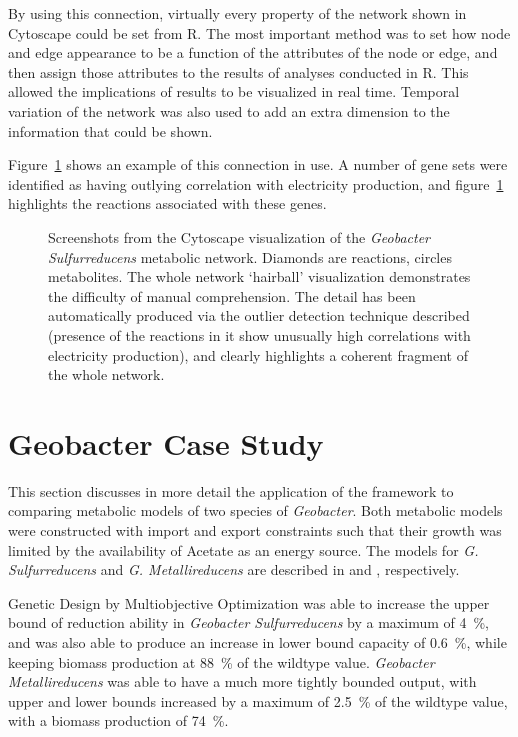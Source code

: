 \documentclass[a4paper]{article}
\begin{document}
By using this connection, virtually every property of the network shown in Cytoscape could be set from R. The most important method was to set how node and edge appearance to be a function of the attributes of the node or edge, and then assign those attributes to the results of analyses conducted in R. This allowed the implications of results to be visualized in real time. Temporal variation of the network was also used to add an extra dimension to the information that could be shown.

Figure~\ref{fig:cytoscape-screenshot} shows an example of this connection in use. A number of gene sets were identified as having outlying correlation with electricity production, and figure~\ref{fig:cytoscape-screenshot} highlights the reactions associated with these genes. 

\begin{figure}[!htb]
\caption{Screenshots from the Cytoscape visualization of the {\it Geobacter Sulfurreducens} metabolic network. 
Diamonds are reactions, circles metabolites. 
The whole network `hairball' visualization demonstrates the difficulty of manual comprehension. 
The detail has been automatically produced via the outlier detection technique described (presence of the reactions in it show unusually high correlations with electricity production), and clearly highlights a coherent fragment of the whole network.}
\label{fig:cytoscape-screenshot}
\end{figure}

\section{Geobacter Case Study}
This section discusses in more detail the application of the framework to comparing metabolic models of two species of {\it Geobacter}. Both metabolic models were constructed with import and export constraints such that their growth was limited by the availability of Acetate as an energy source. The models for {\it G. Sulfurreducens} and {\it G. Metallireducens} are described in \cite{Mahadevan2006} and \cite{Sun2009}, respectively.

Genetic Design by Multiobjective Optimization was able to increase the upper bound of  reduction ability in {\it Geobacter Sulfurreducens} by a maximum of \SI{4}{\percent}, and was also able to produce an increase in lower bound capacity of  \SI{0.6}{\percent}, while keeping biomass production at  \SI{88}{\percent} of the wildtype value. 
{\it Geobacter Metallireducens} was able to have a much more tightly bounded output, with upper and lower bounds increased by a maximum of \SI{2.5}{\percent} of the wildtype value, with a biomass production of \SI{74}{\percent}.
\end{document}
